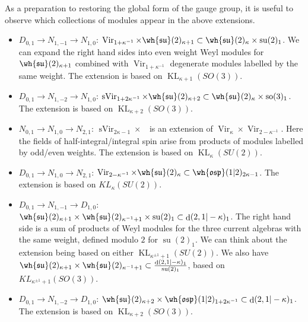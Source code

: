 \documentclass[11pt,reqno]{amsart}
\theoremstyle{plain}
\numberwithin{equation}{section}
\newcommand{\R}{\mathbb{R}}
\DeclareMathOperator{\Vir}{Vir}
\DeclareMathOperator{\sVir}{sVir}
\DeclareMathOperator{\td}{d}
\DeclareMathOperator{\tsu}{su}
\DeclareMathOperator{\tso}{so}
\DeclareMathOperator{\Ff}{\bigwedge_{\R}}
\DeclareMathOperator{\KL}{KL}
\theoremstyle{definition}
\begin{document}
As a preparation to restoring the global form of the gauge group, it
is useful to observe which collections of modules appear in the above
extensions.

\medskip

\begin{itemize}
\item $D_{0,1} \to N_{1,-1} \to N_{1,0}$: $\Vir_{1+\kappa^{-1}} \times \wh{\mathfrak{su}}(2)_{\kappa+1} \subset
\wh{\mathfrak{su}}(2)_{\kappa} \times \tsu(2)_1$. We can expand the right hand sides into even weight 
Weyl modules for $\wh{\mathfrak{su}}(2)_{\kappa+1}$ combined with $\Vir_{1+\kappa^{-1}}$
degenerate modules labelled by the same weight. The extension is based on $\KL_{\kappa+1}(SO(3))$. 

\medskip

\item $D_{0,1} \to N_{1,-2} \to N_{1,0}$:  $\sVir_{1+2 \kappa^{-1}} \times \wh{\mathfrak{su}}(2)_{\kappa+2}\subset
\wh{\mathfrak{su}}(2)_{\kappa} \times \tso(3)_1$. The extension is based on $\KL_{\kappa+2}(SO(3))$. 

\medskip

\item $N_{0,1} \to N_{1,0} \to N_{2,1}$: $\sVir_{2\kappa-1} \times \Ff$ is an extension of
$\Vir_{\kappa} \times \Vir_{2-\kappa^{-1}}$. Here the fields of half-integral/integral spin arise from 
products of modules labelled by odd/even weights. The extension is based on $\KL_{\kappa}(SU(2))$.

\medskip

\item $D_{0,1} \to N_{1,0} \to N_{2,1}$: $\Vir_{2-\kappa^{-1}} \times \wh{\mathfrak{su}}(2)_{\kappa}  \subset
\wh{\mathfrak{osp}}(1|2)_{2\kappa-1}$. The extension is based on $KL_{\kappa}(SU(2))$.

\medskip

\item $D_{0,1} \to N_{1,-1} \to D_{1,0}$: $\wh{\mathfrak{su}}(2)_{\kappa+1} \times \wh{\mathfrak{su}}(2)_{\kappa^{-1}+1}
  \times \tsu(2)_1 \subset \td(2,1|-\kappa)_1$. The right hand side is a sum of products of Weyl modules for the three
  current algebras with the same weight, defined modulo $2$ for $\tsu(2)_1$. We can think about the extension 
  being based on either $\KL_{\kappa^{\pm 1}+1}(SU(2))$. We also have $\wh{\mathfrak{su}}(2)_{\kappa+1} \times \wh{\mathfrak{su}}(2)_{\kappa^{-1}+1} \subset \frac{\td(2,1|-\kappa)_1}{\tsu(2)_1}$, based on 
  $KL_{\kappa^{\pm 1}+1}(SO(3))$.

\medskip

\item $D_{0,1} \to N_{1,-2} \to D_{1,0}$: $\wh{\mathfrak{su}}(2)_{\kappa+2} \times \wh{\mathfrak{osp}}(1|2)_{1
    + 2 \kappa^{-1}} \subset \td(2,1|-\kappa)_1$. The extension is based on $\KL_{\kappa+2}(SO(3))$. 
\end{itemize}
\end{document}
